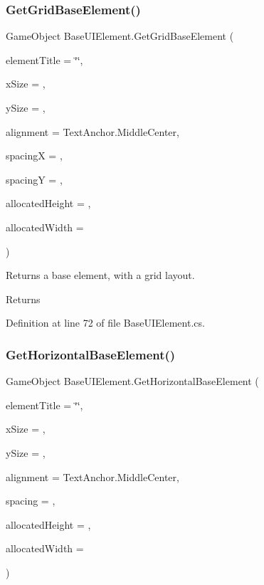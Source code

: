 \subsubsection{\texorpdfstring{Get\+Grid\+Base\+Element()}{GetGridBaseElement()}}
{\footnotesize\ttfamily Game\+Object Base\+U\+I\+Element.\+Get\+Grid\+Base\+Element (\begin{DoxyParamCaption}\item[{string}]{element\+Title = {\ttfamily \char`\"{}\char`\"{}},  }\item[{int}]{x\+Size = {},  }\item[{int}]{y\+Size = {},  }\item[{Text\+Anchor}]{alignment = {\ttfamily TextAnchor.MiddleCenter},  }\item[{int}]{spacingX = {},  }\item[{int}]{spacingY = {},  }\item[{int}]{allocated\+Height = {},  }\item[{int}]{allocated\+Width = {} }\end{DoxyParamCaption})\hspace{0.3cm}{\ttfamily [protected]}}



Returns a base element, with a grid layout. 

\begin{DoxyReturn}{Returns}

\end{DoxyReturn}


Definition at line 72 of file Base\+U\+I\+Element.\+cs.

\mbox{\label{class_base_u_i_element_a27784f8eb56ae3c0062395069052e7cc}} 
\subsubsection{\texorpdfstring{Get\+Horizontal\+Base\+Element()}{GetHorizontalBaseElement()}}
{\footnotesize\ttfamily Game\+Object Base\+U\+I\+Element.\+Get\+Horizontal\+Base\+Element (\begin{DoxyParamCaption}\item[{string}]{element\+Title = {\ttfamily \char`\"{}\char`\"{}},  }\item[{int}]{x\+Size = {},  }\item[{int}]{y\+Size = {},  }\item[{Text\+Anchor}]{alignment = {\ttfamily TextAnchor.MiddleCenter},  }\item[{int}]{spacing = {},  }\item[{int}]{allocated\+Height = {},  }\item[{int}]{allocated\+Width = {} }\end{DoxyParamCaption})\hspace{0.3cm}{\ttfamily [protected]}}



